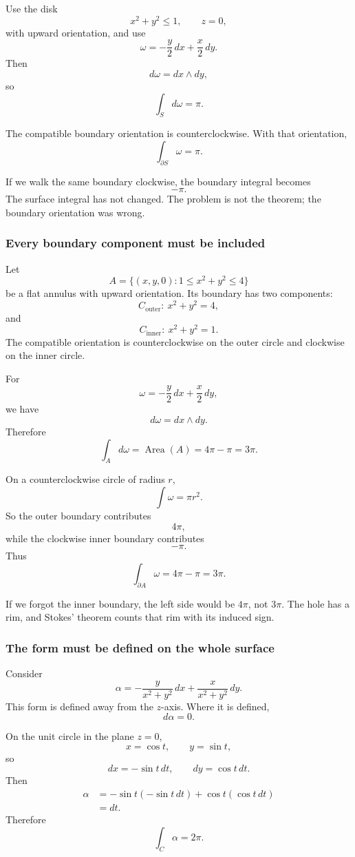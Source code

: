 Use the disk
\[
    x^2+y^2\le1,\qquad z=0,
\]
with upward orientation, and use
\[
    \omega=-\frac y2\,dx+\frac x2\,dy.
\]
Then
\[
    d\omega=dx\wedge dy,
\]
so
\[
    \int_S d\omega=\pi.
\]

The compatible boundary orientation is counterclockwise.  With that orientation,
\[
    \int_{\partial S}\omega=\pi.
\]

If we walk the same boundary clockwise, the boundary integral becomes
\[
    -\pi.
\]
The surface integral has not changed.  The problem is not the theorem; the boundary
orientation was wrong.

\subsubsection*{Every boundary component must be included}

Let
\[
    A=\{(x,y,0):1\le x^2+y^2\le4\}
\]
be a flat annulus with upward orientation.  Its boundary has two components:
\[
    C_{\text{outer}}:\ x^2+y^2=4,
\]
and
\[
    C_{\text{inner}}:\ x^2+y^2=1.
\]
The compatible orientation is counterclockwise on the outer circle and clockwise on the
inner circle.

For
\[
    \omega=-\frac y2\,dx+\frac x2\,dy,
\]
we have
\[
    d\omega=dx\wedge dy.
\]
Therefore
\[
    \int_A d\omega=\operatorname{Area}(A)=4\pi-\pi=3\pi.
\]

On a counterclockwise circle of radius \(r\),
\[
    \int\omega=\pi r^2.
\]
So the outer boundary contributes
\[
    4\pi,
\]
while the clockwise inner boundary contributes
\[
    -\pi.
\]
Thus
\[
    \int_{\partial A}\omega=4\pi-\pi=3\pi.
\]

If we forgot the inner boundary, the left side would be \(4\pi\), not \(3\pi\).
The hole has a rim, and Stokes' theorem counts that rim with its induced sign.

\subsubsection*{The form must be defined on the whole surface}

Consider
\[
    \alpha=
    -\frac{y}{x^2+y^2}\,dx
    +
    \frac{x}{x^2+y^2}\,dy.
\]
This form is defined away from the \(z\)-axis.  Where it is defined,
\[
    d\alpha=0.
\]

On the unit circle in the plane \(z=0\),
\[
    x=\cos t,\qquad y=\sin t,
\]
so
\[
    dx=-\sin t\,dt,\qquad dy=\cos t\,dt.
\]
Then
\[
\begin{aligned}
    \alpha
    &=
    -\sin t(-\sin t\,dt)+\cos t(\cos t\,dt)\\
    &=
    dt.
\end{aligned}
\]
Therefore
\[
\boxed{
    \int_C\alpha=2\pi.
}
\]

